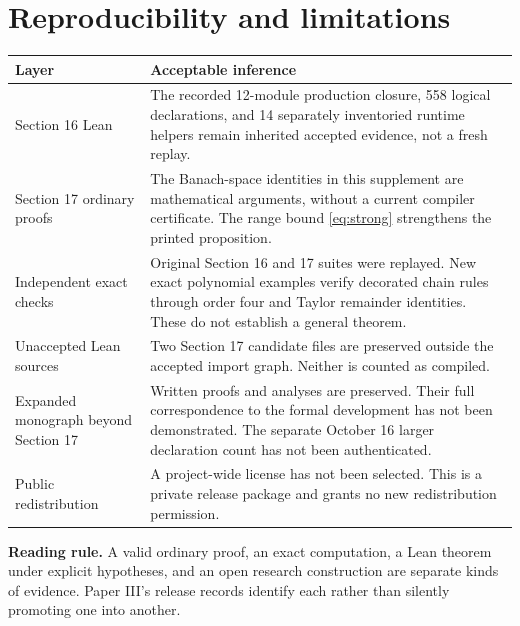 \documentclass[11pt]{article}
\theoremstyle{remark}\newtheorem{remark}[theorem]{Remark}
\begin{document}
\section{Reproducibility and limitations}
\begin{longtable}{@{}p{.29\linewidth}p{.62\linewidth}@{}}
\toprule
\textbf{Layer}&\textbf{Acceptable inference}\\\midrule\endhead
Section 16 Lean&The recorded 12-module production closure, 558 logical declarations, and 14 separately inventoried runtime helpers remain inherited accepted evidence, not a fresh replay.\\
Section 17 ordinary proofs&The Banach-space identities in this supplement are mathematical arguments, without a current compiler certificate. The range bound \eqref{eq:strong} strengthens the printed proposition.\\
Independent exact checks&Original Section 16 and 17 suites were replayed. New exact polynomial examples verify decorated chain rules through order four and Taylor remainder identities. These do not establish a general theorem.\\
Unaccepted Lean sources&Two Section 17 candidate files are preserved outside the accepted import graph. Neither is counted as compiled.\\
Expanded monograph beyond Section 17&Written proofs and analyses are preserved. Their full correspondence to the formal development has not been demonstrated. The separate October 16 larger declaration count has not been authenticated.\\
Public redistribution&A project-wide license has not been selected. This is a private release package and grants no new redistribution permission.\\
\bottomrule
\end{longtable}

\noindent\textbf{Reading rule.} A valid ordinary proof, an exact computation, a Lean theorem under explicit hypotheses, and an open research construction are separate kinds of evidence. Paper III's release records identify each rather than silently promoting one into another.
\end{document}
